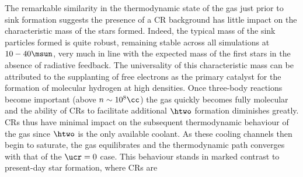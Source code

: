 The remarkable similarity in the thermodynamic state of the gas just prior to sink formation suggests the presence of a CR background has little impact on the characteristic mass of the stars formed.  
Indeed, the typical mass of the sink particles formed is quite robust, remaining stable across all simulations at $10-40\msun$, very much in line with the expected mass of the first stars in the absence of radiative feedback. 
The universality of this characteristic mass can be attributed to the supplanting of free electrons as the primary catalyst for the formation of molecular hydrogen at high densities.  
Once three-body reactions become important (above $n\sim10^8\cc$) the gas quickly becomes fully molecular and the ability of CRs to facilitate additional $\htwo$ formation diminishes greatly. 
CRs thus have minimal impact on the subsequent thermodynamic behaviour of the gas since $\htwo$ is the only available coolant. 
As these cooling channels then begin to saturate, the gas equilibrates and the thermodynamic path converges with that of the $\ucr=0$ case.
This behaviour stands in marked contrast to present-day star formation, where CRs are 


